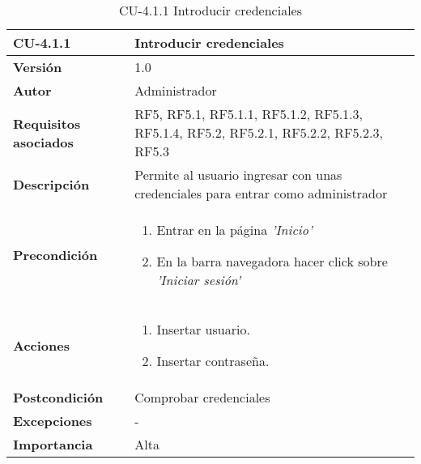 \begin{table}[h!]
	\centering
	\begin{tabularx}{\linewidth}{ p{} p{} }
		\toprule
		\textbf{CU-4.1.1}    & \textbf{Introducir credenciales}\\
		\toprule
		\textbf{Versión}              & 1.0    \\
		\textbf{Autor}                & Administrador \\
		\textbf{Requisitos asociados} & RF5, RF5.1, RF5.1.1, RF5.1.2, RF5.1.3, RF5.1.4, RF5.2, RF5.2.1, RF5.2.2, RF5.2.3, RF5.3\\
		\textbf{Descripción}          & Permite al usuario ingresar con unas credenciales para entrar como administrador\\
        \textbf{Precondición}         &  
  		\begin{enumerate}
			\def\labelenumi{\arabic{enumi}.}
			\tightlist
			\item Entrar en la página \textit{'Inicio'}
			\item En la barra navegadora hacer click sobre \textit{'Iniciar sesión'}
		\end{enumerate}\\
		\textbf{Acciones}             &
		\begin{enumerate}
			\def\labelenumi{\arabic{enumi}.}
			\tightlist
			\item Insertar usuario.
                \item Insertar contraseña.
		\end{enumerate}\\
		\textbf{Postcondición}     &   Comprobar credenciales \\
		\textbf{Excepciones}          & - \\
		\textbf{Importancia}          & Alta \\
		\bottomrule
	\end{tabularx}
	\caption{CU-4.1.1 Introducir credenciales}
\end{table}

